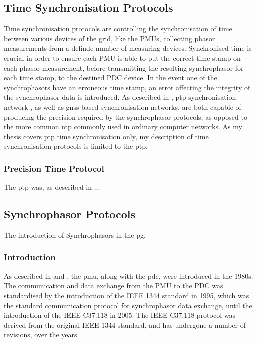 \subsection{Time Synchronisation Protocols}
Time synchronisation protocols are controlling the synchronisation of time between various devices of the grid, like the PMUs, collecting phasor measurements from a definde number of measuring devices. Synchronised time is crucial in order to ensure each PMU is able to put the correct time stamp on each phasor measurement, before transmitting the resulting synchrophasor for each time stamp, to the destined PDC device. In the event one of the synchrophasors have an erroneous time stamp, an error affecting the integrity of the synchrophasor data is introduced. As described in \cite{moussa2016security}, \acrlong{ptp} synchronisation network
, as well as \acrlong{gnss} based synchronisation networks, are both capable of producing the precision required by the synchrophasor protocols, as opposed to the more common \acrfull{ntp} commonly used in ordinary computer networks. As my thesis covers \acrshort{ptp} time synchronisation only, my description of time synchronisation protocols is limited to the \acrfull{ptp}.

\subsubsection{Precision Time Protocol}

The \acrfull{ptp} was, as described in \cite{alghamdi2021precision} ...




\subsection{Synchrophasor Protocols}

The introduction of Synchrophasors in the \acrlong{pg}, 

\subsubsection{Introduction}



As described in \cite{martin2011synchrophasor} and \cite{ali2016performance}, the \acrfull{pmu}, along with the \acrfull{pdc}, were introduced in the 1980s. The communication and data exchange from the PMU to the PDC was standardised by the introduction of the IEEE 1344 standard in 1995, which was the standard communication protocol for synchrophasor data exchange, until the introduction of the IEEE C37.118 in 2005.
The  IEEE C37.118 protocol was derived from the original IEEE 1344 standard, and has undergone a number of revisions, over the years.


